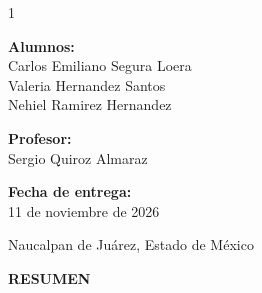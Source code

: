 \documentclass[12pt,letterpaper]{article}
\begin{document}
\begin{titlepage}
\begin{spacing}{1}
\vspace{2.2cm}

\begin{flushright}

\begin{minipage}{0.58\textwidth}

\textbf{Alumnos:}\\[0.15cm]
Carlos Emiliano Segura Loera\\
Valeria Hernandez Santos\\
Nehiel Ramirez Hernandez 

\vspace{0.5cm}

\textbf{Profesor:}\\[0.1cm]
Sergio Quiroz Almaraz

\vspace{0.5cm}

\textbf{Fecha de entrega:}\\[0.1cm]
11 de noviembre de 2026

\vspace{0.5cm}

Naucalpan de Juárez, Estado de México

\end{minipage}

\end{flushright}

\end{spacing}

\end{titlepage}


\setcounter{page}{1}


\tableofcontents

\clearpage


{}

\begin{center}

{\large\bfseries
RESUMEN
}

\end{center}
\end{document}
